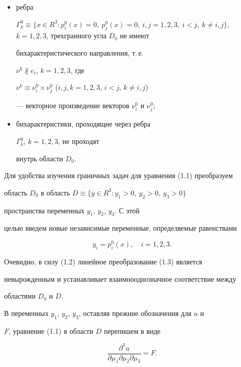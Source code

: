 \begin{itemize}


\item[а)] ребра


$\Gamma^0_k\equiv\{x\in R^3:p^0_i(x)=0,\ p^0_j(x)=0,\ i,j=1,2,3,\ i<j,\


k\ne i,j\}$, $k=1,2,3$, трехгранного угла $D_0$ не имеют


бихарактеристического направления, т.\,е.


$\nu^k\nparallel e_i$, $k=1,2,3$, где


$\nu^k\equiv\nu^0_i\times\nu^0_j$ ($i,j,k=1,2,3$, $i<j$, $k\ne i,j$)


--- векторное произведение векторов $\nu^0_i$ и $\nu^0_j$;


\item[б)] бихарактеристики, проходящие через ребра


$\Gamma^0_k$, $k=1,2,3$, не проходят


внутрь области $D_0$.


\end{itemize}





Для удобства изучения граничных задач для уравнения (1.1) преобразуем


область $D_0$ в область $D\equiv\{y\in R^3:y_1>0,\ y_2>0,\ y_3>0\}$


пространства переменных $y_1$, $y_2$, $y_3$. С этой


целью введем новые независимые переменные, определяемые равенствами


\begin{equation}


y_i=p^0_i(x),\quad i=1,2,3.


\end{equation}


Очевидно, в силу (1.2) линейное преобразование (1.3) является


невырожденным и устанавливает взаимнооднозначное соответствие между


областями $D_0$ и $D$.





В переменных $y_1$, $y_2$, $y_3$, оставляя прежние обозначения для $u$ и


$F$, уравнение (1.1) в области $D$ перепишем в виде


\begin{equation}


\frac{\partial^3 u}{\partial\mu_1\partial\mu_2\partial\mu_3}=F.


\end{equation}


